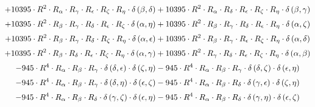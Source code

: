 \begin{subequations}
\begin{gather}
 \\[0.2em] \notag 		 + 10395 \cdot R^{2} \cdot R_{\alpha{}} \cdot R_{\gamma{}} \cdot R_{\epsilon{}} \cdot R_{\zeta{}} \cdot R_{\eta{}} \cdot \delta{}\left(\beta{}, \delta{}\right)+ 10395 \cdot R^{2} \cdot R_{\alpha{}} \cdot R_{\delta{}} \cdot R_{\epsilon{}} \cdot R_{\zeta{}} \cdot R_{\eta{}} \cdot \delta{}\left(\beta{}, \gamma{}\right) 
 \\[0.2em] \notag 		 + 10395 \cdot R^{2} \cdot R_{\beta{}} \cdot R_{\gamma{}} \cdot R_{\delta{}} \cdot R_{\epsilon{}} \cdot R_{\zeta{}} \cdot \delta{}\left(\alpha{}, \eta{}\right)+ 10395 \cdot R^{2} \cdot R_{\beta{}} \cdot R_{\gamma{}} \cdot R_{\delta{}} \cdot R_{\epsilon{}} \cdot R_{\eta{}} \cdot \delta{}\left(\alpha{}, \zeta{}\right) 
 \\[0.2em] \notag 		 + 10395 \cdot R^{2} \cdot R_{\beta{}} \cdot R_{\gamma{}} \cdot R_{\delta{}} \cdot R_{\zeta{}} \cdot R_{\eta{}} \cdot \delta{}\left(\alpha{}, \epsilon{}\right)+ 10395 \cdot R^{2} \cdot R_{\beta{}} \cdot R_{\gamma{}} \cdot R_{\epsilon{}} \cdot R_{\zeta{}} \cdot R_{\eta{}} \cdot \delta{}\left(\alpha{}, \delta{}\right) 
 \\[0.2em] \notag 		 + 10395 \cdot R^{2} \cdot R_{\beta{}} \cdot R_{\delta{}} \cdot R_{\epsilon{}} \cdot R_{\zeta{}} \cdot R_{\eta{}} \cdot \delta{}\left(\alpha{}, \gamma{}\right)+ 10395 \cdot R^{2} \cdot R_{\gamma{}} \cdot R_{\delta{}} \cdot R_{\epsilon{}} \cdot R_{\zeta{}} \cdot R_{\eta{}} \cdot \delta{}\left(\alpha{}, \beta{}\right) 
 \\[0.2em] \notag 		 - 945 \cdot R^{4} \cdot R_{\alpha{}} \cdot R_{\beta{}} \cdot R_{\gamma{}} \cdot \delta{}\left(\delta{}, \epsilon{}\right) \cdot \delta{}\left(\zeta{}, \eta{}\right)- 945 \cdot R^{4} \cdot R_{\alpha{}} \cdot R_{\beta{}} \cdot R_{\gamma{}} \cdot \delta{}\left(\delta{}, \zeta{}\right) \cdot \delta{}\left(\epsilon{}, \eta{}\right) 
 \\[0.2em] \notag 		 - 945 \cdot R^{4} \cdot R_{\alpha{}} \cdot R_{\beta{}} \cdot R_{\gamma{}} \cdot \delta{}\left(\delta{}, \eta{}\right) \cdot \delta{}\left(\epsilon{}, \zeta{}\right)- 945 \cdot R^{4} \cdot R_{\alpha{}} \cdot R_{\beta{}} \cdot R_{\delta{}} \cdot \delta{}\left(\gamma{}, \epsilon{}\right) \cdot \delta{}\left(\zeta{}, \eta{}\right) 
 \\[0.2em] \notag 		 - 945 \cdot R^{4} \cdot R_{\alpha{}} \cdot R_{\beta{}} \cdot R_{\delta{}} \cdot \delta{}\left(\gamma{}, \zeta{}\right) \cdot \delta{}\left(\epsilon{}, \eta{}\right)- 945 \cdot R^{4} \cdot R_{\alpha{}} \cdot R_{\beta{}} \cdot R_{\delta{}} \cdot \delta{}\left(\gamma{}, \eta{}\right) \cdot \delta{}\left(\epsilon{}, \zeta{}\right) 

\end{gather}
\end{subequations}
